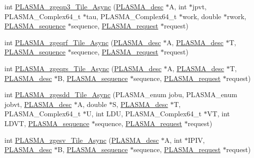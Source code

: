 \begin{DoxyCompactItemize}
int \hyperlink{group__PLASMA__Complex64__t__Tile__Async_ga1b8a1549d7523333e7c65cf2902cb05e_ga1b8a1549d7523333e7c65cf2902cb05e}{P\+L\+A\+S\+M\+A\+\_\+zgeqp3\+\_\+\+Tile\+\_\+\+Async} (\hyperlink{structplasma__desc__t}{P\+L\+A\+S\+M\+A\+\_\+desc} $\ast$A, int $\ast$jpvt, P\+L\+A\+S\+M\+A\+\_\+\+Complex64\+\_\+t $\ast$tau, P\+L\+A\+S\+M\+A\+\_\+\+Complex64\+\_\+t $\ast$work, double $\ast$rwork, \hyperlink{structplasma__sequence__t}{P\+L\+A\+S\+M\+A\+\_\+sequence} $\ast$sequence, \hyperlink{structplasma__request__t}{P\+L\+A\+S\+M\+A\+\_\+request} $\ast$request)
\item 
int \hyperlink{group__PLASMA__Complex64__t__Tile__Async_ga82e726155a07c9f4bb8e9c3a0298c1c4_ga82e726155a07c9f4bb8e9c3a0298c1c4}{P\+L\+A\+S\+M\+A\+\_\+zgeqrf\+\_\+\+Tile\+\_\+\+Async} (\hyperlink{structplasma__desc__t}{P\+L\+A\+S\+M\+A\+\_\+desc} $\ast$A, \hyperlink{structplasma__desc__t}{P\+L\+A\+S\+M\+A\+\_\+desc} $\ast$T, \hyperlink{structplasma__sequence__t}{P\+L\+A\+S\+M\+A\+\_\+sequence} $\ast$sequence, \hyperlink{structplasma__request__t}{P\+L\+A\+S\+M\+A\+\_\+request} $\ast$request)
\item 
int \hyperlink{group__PLASMA__Complex64__t__Tile__Async_ga2e3360f39f4b262354718a6aaefe649c_ga2e3360f39f4b262354718a6aaefe649c}{P\+L\+A\+S\+M\+A\+\_\+zgeqrs\+\_\+\+Tile\+\_\+\+Async} (\hyperlink{structplasma__desc__t}{P\+L\+A\+S\+M\+A\+\_\+desc} $\ast$A, \hyperlink{structplasma__desc__t}{P\+L\+A\+S\+M\+A\+\_\+desc} $\ast$T, \hyperlink{structplasma__desc__t}{P\+L\+A\+S\+M\+A\+\_\+desc} $\ast$B, \hyperlink{structplasma__sequence__t}{P\+L\+A\+S\+M\+A\+\_\+sequence} $\ast$sequence, \hyperlink{structplasma__request__t}{P\+L\+A\+S\+M\+A\+\_\+request} $\ast$request)
\item 
int \hyperlink{group__PLASMA__Complex64__t__Tile__Async_gad5fe25a5457b2f1dbd3a14cfbb125ca4_gad5fe25a5457b2f1dbd3a14cfbb125ca4}{P\+L\+A\+S\+M\+A\+\_\+zgesdd\+\_\+\+Tile\+\_\+\+Async} (P\+L\+A\+S\+M\+A\+\_\+enum jobu, P\+L\+A\+S\+M\+A\+\_\+enum jobvt, \hyperlink{structplasma__desc__t}{P\+L\+A\+S\+M\+A\+\_\+desc} $\ast$A, double $\ast$S, \hyperlink{structplasma__desc__t}{P\+L\+A\+S\+M\+A\+\_\+desc} $\ast$T, P\+L\+A\+S\+M\+A\+\_\+\+Complex64\+\_\+t $\ast$U, int L\+D\+U, P\+L\+A\+S\+M\+A\+\_\+\+Complex64\+\_\+t $\ast$V\+T, int L\+D\+V\+T, \hyperlink{structplasma__sequence__t}{P\+L\+A\+S\+M\+A\+\_\+sequence} $\ast$sequence, \hyperlink{structplasma__request__t}{P\+L\+A\+S\+M\+A\+\_\+request} $\ast$request)
\item 
int \hyperlink{group__PLASMA__Complex64__t__Tile__Async_ga34f307dbc6cd1dc5adab0970fe559a30_ga34f307dbc6cd1dc5adab0970fe559a30}{P\+L\+A\+S\+M\+A\+\_\+zgesv\+\_\+\+Tile\+\_\+\+Async} (\hyperlink{structplasma__desc__t}{P\+L\+A\+S\+M\+A\+\_\+desc} $\ast$A, int $\ast$I\+P\+I\+V, \hyperlink{structplasma__desc__t}{P\+L\+A\+S\+M\+A\+\_\+desc} $\ast$B, \hyperlink{structplasma__sequence__t}{P\+L\+A\+S\+M\+A\+\_\+sequence} $\ast$sequence, \hyperlink{structplasma__request__t}{P\+L\+A\+S\+M\+A\+\_\+request} $\ast$request)

\end{DoxyCompactItemize}
